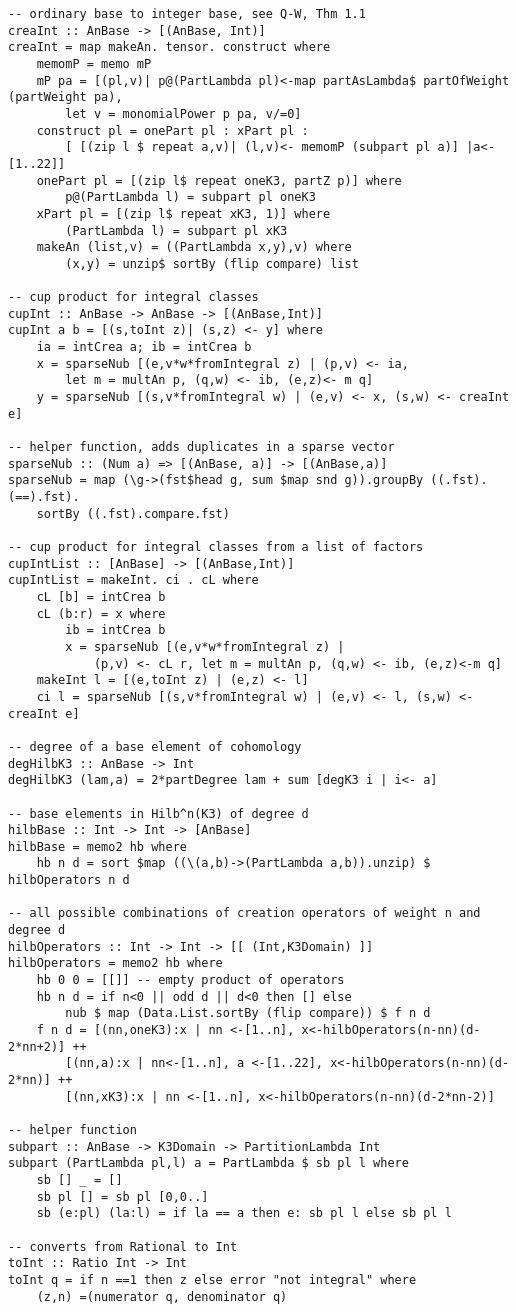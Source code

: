 \begin{lstlisting}
-- ordinary base to integer base, see Q-W, Thm 1.1
creaInt :: AnBase -> [(AnBase, Int)]
creaInt = map makeAn. tensor. construct where
	memomP = memo mP
	mP pa = [(pl,v)| p@(PartLambda pl)<-map partAsLambda$ partOfWeight (partWeight pa), 
		let v = monomialPower p pa, v/=0]
	construct pl = onePart pl : xPart pl : 
		[ [(zip l $ repeat a,v)| (l,v)<- memomP (subpart pl a)] |a<-[1..22]] 
	onePart pl = [(zip l$ repeat oneK3, partZ p)] where 
		p@(PartLambda l) = subpart pl oneK3
	xPart pl = [(zip l$ repeat xK3, 1)] where 
		(PartLambda l) = subpart pl xK3
	makeAn (list,v) = ((PartLambda x,y),v) where 
		(x,y) = unzip$ sortBy (flip compare) list 

-- cup product for integral classes
cupInt :: AnBase -> AnBase -> [(AnBase,Int)]
cupInt a b = [(s,toInt z)| (s,z) <- y] where
	ia = intCrea a; ib = intCrea b
	x = sparseNub [(e,v*w*fromIntegral z) | (p,v) <- ia, 
		let m = multAn p, (q,w) <- ib, (e,z)<- m q] 
	y = sparseNub [(s,v*fromIntegral w) | (e,v) <- x, (s,w) <- creaInt e]

-- helper function, adds duplicates in a sparse vector
sparseNub :: (Num a) => [(AnBase, a)] -> [(AnBase,a)] 
sparseNub = map (\g->(fst$head g, sum $map snd g)).groupBy ((.fst).(==).fst). 
	sortBy ((.fst).compare.fst)

-- cup product for integral classes from a list of factors
cupIntList :: [AnBase] -> [(AnBase,Int)]
cupIntList = makeInt. ci . cL where
	cL [b] = intCrea b
	cL (b:r) = x where
		ib = intCrea b
		x = sparseNub [(e,v*w*fromIntegral z) | 
			(p,v) <- cL r, let m = multAn p, (q,w) <- ib, (e,z)<-m q]
	makeInt l = [(e,toInt z) | (e,z) <- l]
	ci l = sparseNub [(s,v*fromIntegral w) | (e,v) <- l, (s,w) <- creaInt e]

-- degree of a base element of cohomology
degHilbK3 :: AnBase -> Int
degHilbK3 (lam,a) = 2*partDegree lam + sum [degK3 i | i<- a]

-- base elements in Hilb^n(K3) of degree d 
hilbBase :: Int -> Int -> [AnBase]
hilbBase = memo2 hb where
	hb n d = sort $map ((\(a,b)->(PartLambda a,b)).unzip) $ hilbOperators n d  

-- all possible combinations of creation operators of weight n and degree d
hilbOperators :: Int -> Int -> [[ (Int,K3Domain) ]]
hilbOperators = memo2 hb where 
	hb 0 0 = [[]] -- empty product of operators
	hb n d = if n<0 || odd d || d<0 then [] else 
		nub $ map (Data.List.sortBy (flip compare)) $ f n d
	f n d = [(nn,oneK3):x | nn <-[1..n], x<-hilbOperators(n-nn)(d-2*nn+2)] ++
		[(nn,a):x | nn<-[1..n], a <-[1..22], x<-hilbOperators(n-nn)(d-2*nn)] ++
		[(nn,xK3):x | nn <-[1..n], x<-hilbOperators(n-nn)(d-2*nn-2)] 

-- helper function
subpart :: AnBase -> K3Domain -> PartitionLambda Int
subpart (PartLambda pl,l) a = PartLambda $ sb pl l where
	sb [] _ = []
	sb pl [] = sb pl [0,0..]
	sb (e:pl) (la:l) = if la == a then e: sb pl l else sb pl l

-- converts from Rational to Int
toInt :: Ratio Int -> Int
toInt q = if n ==1 then z else error "not integral" where 
	(z,n) =(numerator q, denominator q)
\end{lstlisting}